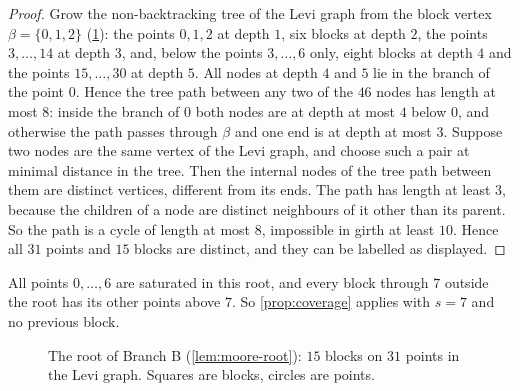 \documentclass[11pt]{amsart}
\theoremstyle{definition}
\theoremstyle{remark}
\begin{document}
\begin{proof}
Grow the non-backtracking tree of the Levi graph from the block vertex
$\beta=\{0,1,2\}$ (\cref{fig:root}): the points $0,1,2$ at depth $1$, six
blocks at depth $2$, the points $3,\dots,14$ at depth $3$, and, below the points
$3,\dots,6$ only, eight blocks at depth $4$ and the points $15,\dots,30$ at
depth $5$. All nodes at depth $4$ and $5$ lie in the branch of the point $0$.
Hence the tree path between any two of the $46$ nodes has length at most $8$:
inside the branch of $0$ both nodes are at depth at most $4$ below $0$, and
otherwise the path passes through $\beta$ and one end is at depth at most $3$.
Suppose two nodes are the same vertex of the Levi graph, and choose such a pair
at minimal distance in the tree. Then the internal nodes of the tree path
between them are distinct vertices, different from its ends. The path has length
at least $3$, because the children of a node are distinct neighbours of it other
than its parent. So the path is a cycle of length at most $8$, impossible in
girth at least $10$. Hence
all $31$ points and $15$ blocks are distinct, and they can be labelled as
displayed.
\end{proof}

All points $0,\dots,6$ are saturated in this root, and every block through $7$
outside the root has its other points above $7$. So \cref{prop:coverage} applies
with $s=7$ and no previous block.

\begin{figure}[ht]
\centering
{}
\caption{The root of Branch B (\cref{lem:moore-root}): $15$ blocks on $31$
points in the Levi graph. Squares are blocks, circles are points.}
\label{fig:root}
\end{figure}
\end{document}
